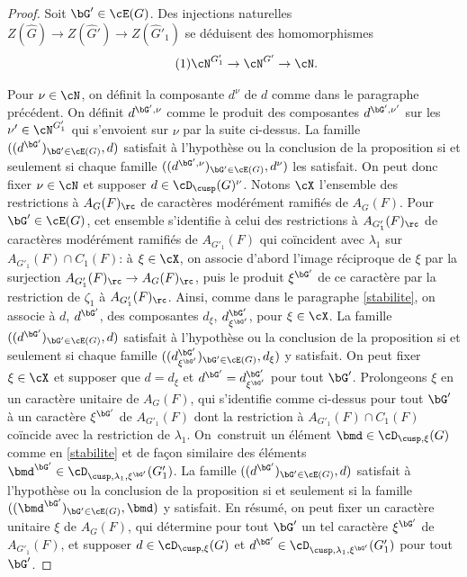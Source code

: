 \begin{proof}
Soit $\bG'\in \cE(G)$. Des injections naturelles $Z(\hat{G})\to Z(\hat{G}')\to Z(\hat{G}'_{1})$ se déduisent des homomorphismes\vspace*{-3pt}
\begin{equation}\tag{1}\label{finale1}
\cN^{G'_{1}}\to \cN^{G'}\to \cN.
\end{equation}

Pour $\nu\in \cN$, on définit la composante $d^{\nu}$ de $d$ comme dans le paragraphe précédent. On définit $d^{\bG',\nu}$ comme le produit des composantes $d^{\bG',\nu'}$ sur les $\nu'\in \cN^{G'_{1}}$ qui s'envoient sur $\nu$ par la suite ci-dessus. La famille $((d^{\bG'})_{\bG'\in \cE(G)},d)$ satisfait à l'hypothèse ou la conclusion de la proposition si et seulement si chaque famille $((d^{\bG',\nu})_{\bG'\in \cE(G)},d^{\nu})$ les satisfait. On peut donc fixer $\nu\in \cN$ et supposer $d\in \cD_{\cusp}(G)^{\nu}$. Notons $\cX$ l'ensemble des restrictions à $A_{G}(F)_{\rc}$ de caractères modérément ramifiés de $A_{G}(F)$. Pour $\bG'\in \cE(G)$, cet ensemble s'identifie à celui des restrictions à $A_{G'_{1}}(F)_{\rc}$ de caractères modérément ramifiés de $A_{G'_{1}}(F)$ qui coïncident avec $\lambda_{1}$ sur $A_{G'_{1}}(F)\cap C_{1}(F)$: à $\xi\in \cX$, on associe d'abord l'image réciproque de $\xi$ par la surjection $A_{G'_{1}}(F)_{\rc}\to A_{G}(F)_{\rc}$, puis le produit $\xi^{\bG'}$ de ce caractère par la restriction de $\zeta_{1}$ à $A_{G'_{1}}(F)_{\rc}$. Ainsi, comme dans le paragraphe \ref{stabilite}, on associe à $d$, \resp $d^{\bG'}$, des composantes $d_{\xi}$, \resp $d^{\bG'}_{\xi^{\bG'}}$, pour $\xi\in \cX$. La famille $((d^{\bG'})_{\bG'\in \cE(G)},d)$ satisfait à l'hypothèse ou la conclusion de la proposition si et seulement si chaque famille $((d^{\bG'}_{\xi^{\bG'}})_{\bG'\in \cE(G)},d_{\xi})$ y satisfait. On peut fixer $\xi\in \cX$ et supposer que $d=d_{\xi}$ et $d^{\bG'}=d^{\bG'}_{\xi^{\bG'}}$ pour tout $\bG'$. Prolongeons $\xi$ en un caractère unitaire de $A_{G}(F)$, qui s'identifie comme ci-dessus pour tout $\bG'$ à un caractère $\xi^{\bG'}$ de $A_{G'_{1}}(F)$ dont la restriction à $A_{G'_{1}}(F)\cap C_{1}(F)$ coïncide avec la restriction de $\lambda_{1}$. On~construit un élément $\bmd\in \cD_{\cusp,\xi}(G)$ comme en \ref{stabilite} et de façon similaire des éléments $\bmd^{\bG'}\in \cD_{\cusp,\lambda_{1},\xi^{\bG'}}(G'_{1})$. La famille $((d^{\bG'})_{\bG'\in \cE(G)},d)$ satisfait à l'hypothèse ou la conclusion de la proposition si et seulement si la famille $((\bmd^{\bG'})_{\bG'\in \cE(G)},\bmd)$ y satisfait. En résumé, on peut fixer un caractère unitaire $\xi$ de $A_{G}(F)$, qui détermine pour tout $\bG'$ un tel caractère $\xi^{\bG'}$ de $A_{G'_{1}}(F)$, et supposer $d\in \cD_{\cusp,\xi}(G)$ et $d^{\bG'}\in \cD_{\cusp,\lambda_{1},\xi^{\bG'}}(G'_{1})$ pour tout $\bG'$.


\end{proof}
